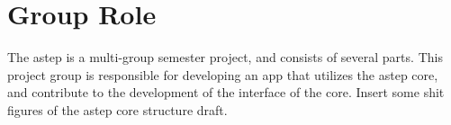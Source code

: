 \chapter{Group Role}
The \gls{astep} is a multi-group semester project, and consists of several parts. This project group is responsible for developing an app that utilizes the \gls{astep} core, and contribute to the development of the interface of the core.
Insert some shit figures of the \gls{astep} core structure draft.